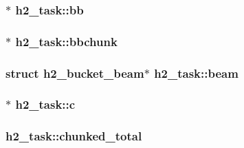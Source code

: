 \subsubsection[{\texorpdfstring{bb}{bb}}]{$\ast$ h2\+\_\+task\+::bb}\hypertarget{structh2__task_a82bebe65b8eb52621a54a77be1e2367a}{}\label{structh2__task_a82bebe65b8eb52621a54a77be1e2367a}
\subsubsection[{\texorpdfstring{bbchunk}{bbchunk}}]{$\ast$ h2\+\_\+task\+::bbchunk}\hypertarget{structh2__task_a56210dd30d8de269972b8b52019dcd4a}{}\label{structh2__task_a56210dd30d8de269972b8b52019dcd4a}
\subsubsection[{\texorpdfstring{beam}{beam}}]{\setlength{\rightskip}{0pt plus 5cm}struct {\bf h2\+\_\+bucket\+\_\+beam}$\ast$ h2\+\_\+task\+::beam}\hypertarget{structh2__task_a6f995ac5b18536f486fc2e50dc8363ad}{}\label{structh2__task_a6f995ac5b18536f486fc2e50dc8363ad}
\subsubsection[{\texorpdfstring{c}{c}}]{$\ast$ h2\+\_\+task\+::c}\hypertarget{structh2__task_a31da3014d93bc040c945182b35b2e573}{}\label{structh2__task_a31da3014d93bc040c945182b35b2e573}
\subsubsection[{\texorpdfstring{chunked\+\_\+total}{chunked_total}}]{ h2\+\_\+task\+::chunked\+\_\+total}\hypertarget{structh2__task_aa453d27a11faa79974682a4a5ec6afa2}{}\label{structh2__task_aa453d27a11faa79974682a4a5ec6afa2}
